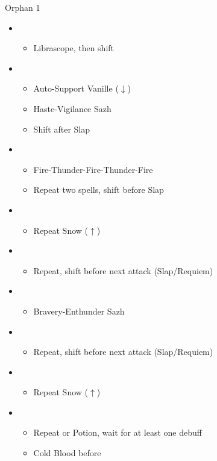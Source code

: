 \begin{battle}{Orphan 1}
	\begin{itemize}
		\item \second
			\begin{itemize}
				\item Librascope, then shift
			\end{itemize}
		\item \third
			\begin{itemize}
				\item Auto-Support Vanille ($\downarrow$)
				\item Haste-Vigilance Sazh
				\item Shift after Slap
			\end{itemize}
		\item \sixth
			\begin{itemize}
				\item Fire-Thunder-Fire-Thunder-Fire
				\item Repeat two spells, shift before Slap
			\end{itemize}
		\item \third
			\begin{itemize}
				\item Repeat Snow ($\uparrow$)
			\end{itemize}
		\item \sixth
			\begin{itemize}
				\item Repeat, shift before next attack (Slap/Requiem)
			\end{itemize}
		\item \third
			\begin{itemize}
				\item Bravery-Enthunder Sazh
			\end{itemize}
		\item \fifth
			\begin{itemize}
				\item Repeat, shift before next attack (Slap/Requiem)
			\end{itemize}
		\item \third
			\begin{itemize}
				\item Repeat Snow ($\uparrow$)
			\end{itemize}
		\item \fifth
			\begin{itemize}
				\item Repeat or Potion, wait for at least one debuff
				\item Cold Blood before \stagger

\end{itemize}
\end{itemize}
\end{battle}
